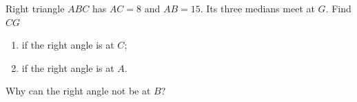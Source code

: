 Right triangle $ABC$ has $AC=8$ and $AB=15$. Its three medians meet at $G$. Find $CG$
\begin{enumerate}
\item[(a)] if the right angle is at $C$;
\item[(b)] if the right angle is at $A$.
\end{enumerate}
Why can the right angle not be at $B$?
